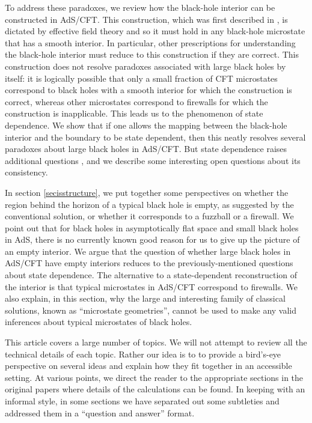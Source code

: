 \documentclass[12pt]{article}
\begin{document}
To address these paradoxes, we review how the black-hole interior can be constructed in AdS/CFT. This construction, which was first described in \cite{Papadodimas:2013jku}, is dictated by effective field theory and so it must hold in any black-hole microstate that has a smooth interior. In particular, other prescriptions for understanding the black-hole interior must reduce to this construction if they are correct. This construction does not resolve paradoxes associated with large black holes by itself: it is logically possible that only a small fraction of CFT microstates correspond to black holes with a smooth interior for which the construction is correct, whereas other microstates correspond to firewalls for which the construction is inapplicable. This leads us to the phenomenon of state dependence. We show that if one allows the mapping between the black-hole interior and the boundary to be state dependent, then this neatly resolves several paradoxes about large black holes in AdS/CFT. But state dependence raises additional questions \cite{Marolf:2015dia,Raju:2016vsu}, and we describe
some interesting open questions about its consistency.




In section \ref{secisstructure}, we put together some perspectives on whether the region behind the horizon of a typical black hole is empty, as suggested by the conventional solution, or whether it corresponds to a fuzzball or a firewall. We point out that for black holes in asymptotically flat space and small black holes in AdS, there is no currently known good reason for us to give up the picture of an empty interior. We argue that the question of whether large black holes in AdS/CFT have empty interiors reduces to the previously-mentioned questions about state dependence.
The alternative to a state-dependent reconstruction of the interior is that typical microstates in AdS/CFT correspond to firewalls. We also explain, in this section, why the large and interesting family of classical solutions, known as ``microstate geometries'',  cannot be used to make any valid inferences about typical microstates of black holes.

This article covers a large number of topics. We will not attempt to review all the technical details of each topic.
Rather our idea is to to provide a bird's-eye perspective on several ideas and explain how they fit together in an accessible setting. At various points, we direct the reader to the appropriate sections in the original papers where details of the calculations can be found.  
 In keeping with an informal style, in some sections we have separated out some subtleties and addressed them in a ``question and answer'' format.
\end{document}
